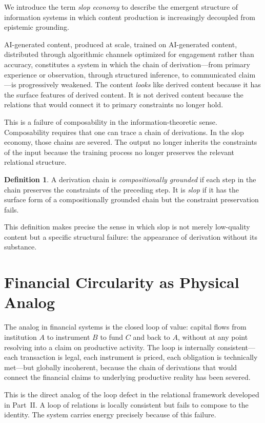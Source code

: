 \documentclass[12pt,a4paper,openany]{book}
\theoremstyle{plain}
\theoremstyle{definition}
\newtheorem{definition}[theorem]{Definition}
\theoremstyle{remark}
\begin{document}
We introduce the term \emph{slop economy} to describe the emergent structure of information systems in which content production is increasingly decoupled from epistemic grounding.

AI-generated content, produced at scale, trained on AI-generated content, distributed through algorithmic channels optimized for engagement rather than accuracy, constitutes a system in which the chain of derivation---from primary experience or observation, through structured inference, to communicated claim---is progressively weakened. The content \emph{looks} like derived content because it has the surface features of derived content. It is not derived content because the relations that would connect it to primary constraints no longer hold.

This is a failure of composability in the information-theoretic sense. Composability requires that one can trace a chain of derivations. In the slop economy, those chains are severed. The output no longer inherits the constraints of the input because the training process no longer preserves the relevant relational structure.

\begin{definition}
A derivation chain is \emph{compositionally grounded} if each step in the chain preserves the constraints of the preceding step. It is \emph{slop} if it has the surface form of a compositionally grounded chain but the constraint preservation fails.
\end{definition}

This definition makes precise the sense in which slop is not merely low-quality content but a specific structural failure: the appearance of derivation without its substance.

\section{Financial Circularity as Physical Analog}

The analog in financial systems is the closed loop of value: capital flows from institution $A$ to instrument $B$ to fund $C$ and back to $A$, without at any point resolving into a claim on productive activity. The loop is internally consistent---each transaction is legal, each instrument is priced, each obligation is technically met---but globally incoherent, because the chain of derivations that would connect the financial claims to underlying productive reality has been severed.

This is the direct analog of the loop defect in the relational framework developed in Part~II. A loop of relations is locally consistent but fails to compose to the identity. The system carries energy precisely because of this failure.
\end{document}

